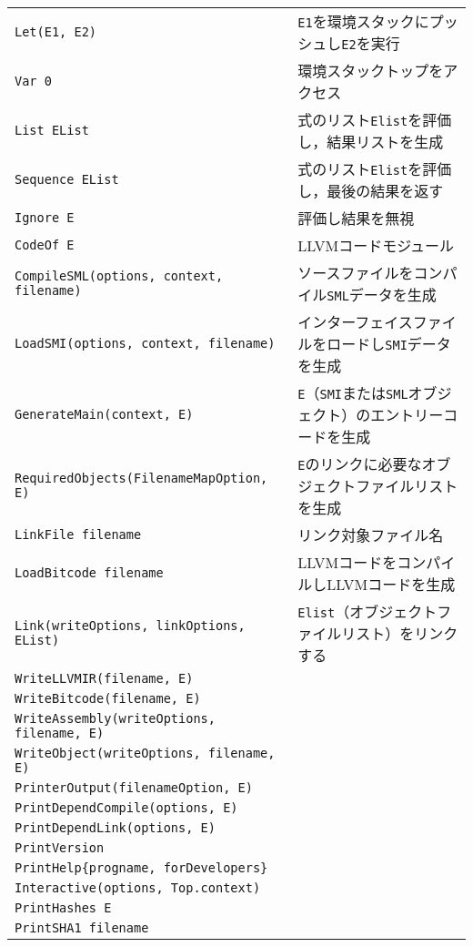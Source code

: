 \documentclass{jbook}
\newcommand{\code}[1]{\mbox{\large\tt #1}}
\begin{document}
\begin{enumerate}
\begin{enumerate}
\begin{tabular}{ll}
\code{Let(E1, E2)} & \code{E1}を環境スタックにプッシュし\code{E2}を実行
\\
\code{Var 0} & 環境スタックトップをアクセス
\\
\code{List EList} & 式のリスト\code{Elist}を評価し，結果リストを生成
\\
\code{Sequence EList} & 式のリスト\code{Elist}を評価し，最後の結果を返す
\\
\code{Ignore E} & 評価し結果を無視
\\
\code{CodeOf E} 
& LLVMコードモジュール
\\
\code{CompileSML(options, context, filename)}
& ソースファイルをコンパイル\code{SML}データを生成
\\
\code{LoadSMI(options, context, filename)}
& インターフェイスファイルをロードし\code{SMI}データを生成
\\
\code{GenerateMain(context, E)}
& \code{E}（\code{SMI}または\code{SML}オブジェクト）のエントリーコードを生成
\\
\code{RequiredObjects(FilenameMapOption, E)}
& \code{E}のリンクに必要なオブジェクトファイルリストを生成
\\
\code{LinkFile filename}
& リンク対象ファイル名
\\
\code{LoadBitcode filename}
& LLVMコードをコンパイルしLLVMコードを生成
\\
\code{Link(writeOptions, linkOptions, EList)}
& \code{Elist}（オブジェクトファイルリスト）をリンクする
\\
\code{WriteLLVMIR(filename, E)}
\\
\code{WriteBitcode(filename, E)}
\\
\code{WriteAssembly(writeOptions, filename, E)}
\\
\code{WriteObject(writeOptions, filename, E)}
\\
\code{PrinterOutput(filenameOption, E)}
\\
\code{PrintDependCompile(options, E)}
\\
\code{PrintDependLink(options, E)}
\\
\code{PrintVersion}
\\
\code{PrintHelp\{progname, forDevelopers\}}
\\
\code{Interactive(options, Top.context)}
\\
\code{PrintHashes E}
\\
\code{PrintSHA1 filename}
\\
\end{tabular}


\end{enumerate}
\end{enumerate}
\end{document}
